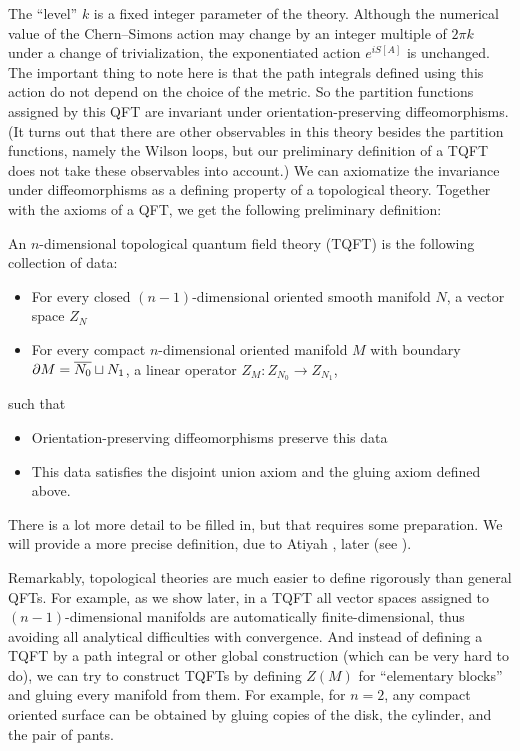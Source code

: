 The ``level'' $k$ is a fixed integer parameter of the theory. Although the
numerical value of the Chern--Simons action may change by an integer multiple of
$2\pi k$ under a change of trivialization, the exponentiated action $e^{i S[A]}$
is unchanged. The important thing to note here is that the path integrals
defined using this action do not depend on the choice of the metric. So the
partition functions assigned by this QFT are invariant under
orientation-preserving diffeomorphisms. (It turns out that there are other
observables in this theory besides the partition functions, namely the Wilson
loops, but our preliminary definition of a TQFT does not take these observables
into account.) We can axiomatize the invariance under diffeomorphisms as a
defining property of a topological theory. Together with the axioms of a QFT, we
get the following preliminary definition:

\begin{predefinition}\label{d:ptqft}
  An $n$-dimensional topological quantum field theory (TQFT) is the following
  collection of data:
  \begin{itemize}
    \item For every closed $(n-1)$-dimensional oriented smooth manifold $N$, a
      vector space $Z_N$
    \item For every compact $n$-dimensional oriented manifold $M$ with boundary
      $\partial M=\overline{N_0}\sqcup N_1$, a linear operator
      $Z_M\colon Z_{N_0}\to Z_{N_1}$,
  \end{itemize}

  such that

  \begin{itemize}
  	\item Orientation-preserving diffeomorphisms preserve this data
  	\item This data satisfies the disjoint union axiom and the gluing axiom
  	  defined above.
  \end{itemize}

\end{predefinition}

There is a lot more detail to be filled in, but that requires some preparation.
We will provide a more precise definition, due to Atiyah , later
(see ).

Remarkably, topological theories are much easier to define rigorously than
general QFTs. For example, as we show later, in a TQFT all vector spaces
assigned to $(n-1)$-dimensional manifolds are automatically finite-dimensional,
thus avoiding all analytical difficulties with convergence. And instead of
defining a TQFT by a path integral or other global construction (which can be
very hard to do), we can try to construct TQFTs by defining $Z(M)$ for
``elementary blocks'' and gluing every manifold from them. For example, for
$n=2$, any compact oriented surface can be obtained by gluing copies of the
disk, the cylinder, and the pair of pants.
\begin{center}
\end{center}

